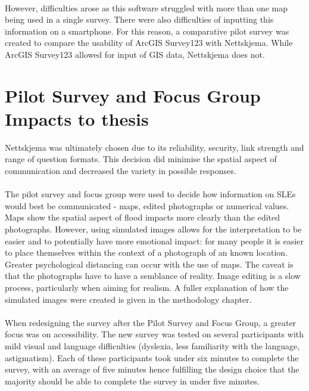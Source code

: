 \paragraph{}

However, difficulties arose as this software struggled with more than one map being used in a single survey. There were also difficulties of inputting this information on a smartphone. For this reason, a comparative pilot survey was created to compare the usability of ArcGIS Survey123 with Nettskjema. While ArcGIS Survey123 allowed for input of GIS data, Nettskjema does not.

\section{Pilot Survey and Focus Group Impacts to thesis}
Nettskjema was ultimately chosen due to its reliability, security, link strength and range of question formats.  This decision did minimise the spatial aspect of communication and decreased the variety in possible responses. 
\paragraph{}
The pilot survey and focus group were used to decide how information on SLEs would best be communicated - maps, edited photographs or numerical values. Maps show the spatial aspect of flood impacts more clearly than the edited photographs. However, using simulated images allows for the interpretation to be easier and to potentially have more emotional impact: for many people it is easier to place themselves within the context of a photograph of an known location. Greater psychological distancing can occur with the use of maps. The caveat is that the photographs have to have a semblance of reality. Image editing is a slow process, particularly when aiming for realism.  A fuller explanation of how the simulated images were created is given in the methodology chapter. 
\paragraph{}

When redesigning the survey after the Pilot Survey and Focus Group, a greater focus was on accessibility. The new survey was tested on several participants with mild visual and language difficulties (dyslexia, less familiarity with the language, astigmatism).  Each of these participants took under six minutes to complete the survey, with an average of five minutes hence fulfilling the design choice that the majority should be able to complete the survey in under five minutes. 
